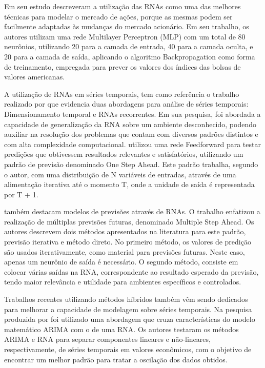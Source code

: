 Em seu estudo  descreveram a utilização das RNAs como uma das melhores técnicas para modelar o mercado de ações, porque as mesmas podem ser facilmente adaptadas às mudanças do mercado acionário. Em seu trabalho, os autores utilizam uma rede Multilayer Perceptron (MLP) com um total de 80 neurônios, utilizando 20 para a camada de entrada, 40 para a camada oculta, e 20 para a camada de saída, aplicando o algoritmo Backpropagation como forma de treinamento, empregada para prever os valores dos índices das bolsas de valores americanas.

A utilização de RNAs em séries temporais, tem como referência o trabalho realizado por  que evidencia duas abordagens para análise de séries temporais: Dimensionamento temporal e RNAs recorrentes. Em sua pesquisa, foi abordada a capacidade de generalização da RNA sobre um ambiente desconhecido, podendo auxiliar na resolução dos problemas que contam com diversos padrões distintos e com alta complexidade computacional.  utilizou uma rede Feedforward para testar predições que obtivessem resultados relevantes e satisfatórios, utilizando um padrão de previsão denominado One Step Ahead. Este padrão trabalha, segundo o autor, com uma distribuição de  N variáveis de entradas, através de uma alimentação iterativa até o momento T, onde a unidade de saída é representada por T + 1.

 também destacam modelos de previsões através de RNAs. O trabalho enfatizou a realização de múltiplas previsões futuras, denominado Multiple Step Ahead. Os autores descrevem dois métodos apresentados na literatura para  este padrão, previsão iterativa e método direto. No primeiro método, os  valores de predição são usados iterativamente, como material para previsões futuras. Neste caso, apenas um neurônio de saída é necessário. O segundo método, consiste em colocar várias saídas na RNA, correspondente ao resultado esperado da previsão, tendo maior  relevância e utilidade  para ambientes específicos e controlados.

Trabalhos recentes utilizando métodos híbridos também vêm sendo dedicados para melhorar a capacidade de modelagem sobre séries temporais. Na pesquisa produzida por  foi utilizado uma abordagem que cruza características do modelo matemático ARIMA com o de uma RNA. Os autores testaram os métodos ARIMA e RNA para separar componentes lineares e não-lineares, respectivamente, de séries temporais em valores econômicos, com o objetivo de encontrar um melhor padrão para tratar a oscilação dos dados obtidos.

